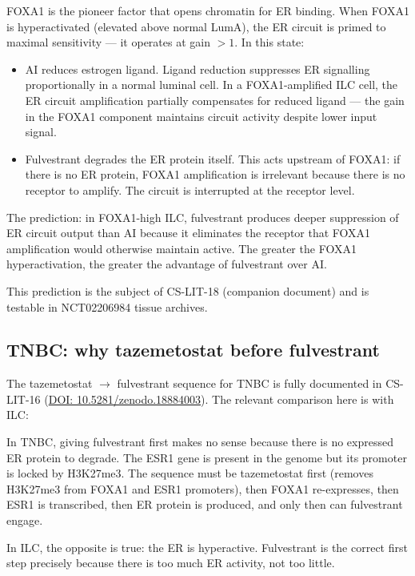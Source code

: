 \documentclass[12pt, a4paper]{article}
\begin{document}
FOXA1 is the pioneer factor that opens chromatin
for ER binding. When FOXA1 is hyperactivated
(elevated above normal LumA), the ER circuit is
primed to maximal sensitivity --- it operates at
gain $>1$. In this state:

\begin{itemize}
    \item AI reduces estrogen ligand. Ligand
    reduction suppresses ER signalling proportionally
    in a normal luminal cell. In a FOXA1-amplified
    ILC cell, the ER circuit amplification partially
    compensates for reduced ligand --- the gain
    in the FOXA1 component maintains circuit
    activity despite lower input signal.
    \item Fulvestrant degrades the ER protein
    itself. This acts upstream of FOXA1: if there
    is no ER protein, FOXA1 amplification is
    irrelevant because there is no receptor to
    amplify. The circuit is interrupted at the
    receptor level.
\end{itemize}

The prediction: in FOXA1-high ILC, fulvestrant
produces deeper suppression of ER circuit output
than AI because it eliminates the receptor that
FOXA1 amplification would otherwise maintain
active. The greater the FOXA1 hyperactivation,
the greater the advantage of fulvestrant over AI.

This prediction is the subject of CS-LIT-18
(companion document) and is testable in
NCT02206984 tissue archives.

\subsection{TNBC: why tazemetostat before
fulvestrant}

The tazemetostat $\rightarrow$ fulvestrant
sequence for TNBC is fully documented in
CS-LIT-16
(\href{https://doi.org/10.5281/zenodo.18884003}
{DOI: 10.5281/zenodo.18884003}). The relevant
comparison here is with ILC:

In TNBC, giving fulvestrant first makes no
sense because there is no expressed ER protein
to degrade. The ESR1 gene is present in the
genome but its promoter is locked by H3K27me3.
The sequence must be tazemetostat first (removes
H3K27me3 from FOXA1 and ESR1 promoters),
then FOXA1 re-expresses, then ESR1 is
transcribed, then ER protein is produced, and
only then can fulvestrant engage.

In ILC, the opposite is true: the ER is
hyperactive. Fulvestrant is the correct first
step precisely because there is too much ER
activity, not too little.
\end{document}
